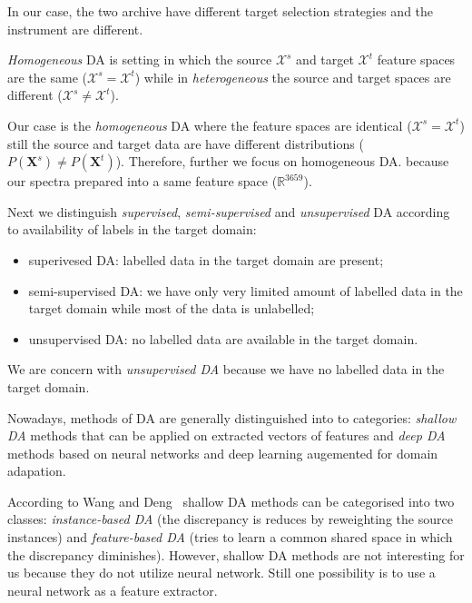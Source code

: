 In our case, the two archive have different target selection strategies
and the instrument are different.

\begin{definition}
	\textit{Homogeneous} DA is setting in which the source \(\mathcal{X}^s\)
	and target \(\mathcal{X}^t\) feature spaces are the same
	(\(\mathcal{X}^s = \mathcal{X}^t\))
	while in \textit{heterogeneous} the source and target spaces are different
	(\(\mathcal{X}^s \ne \mathcal{X}^t\)).~\cite{csurka2017}
\end{definition}

Our case is the \textit{homogeneous} DA where the feature spaces are identical
(\(\mathcal{X}^s = \mathcal{X}^t\))
still the source and target data are have different distributions
(\(P(\mathbf{X}^s) \ne P(\mathbf{X}^t)\)).
Therefore, further we focus on homogeneous DA.
because our spectra prepared into a same feature space (\(\mathbb{R}^{3659}\)).

Next we distinguish \textit{supervised}, \textit{semi-supervised}
and \textit{unsupervised} DA
according to availability of labels in the target domain:

\begin{itemize}
	\item superivesed DA: labelled data in the target domain are present;
	\item semi-supervised DA: we have only very limited amount of labelled data in the target domain while most of the data is unlabelled;
	\item unsupervised DA: no labelled data are available in the target domain.
\end{itemize}

We are concern with \textit{unsupervised DA} because we have
no labelled data in the target domain.~\cite{wang2018}

Nowadays, methods of DA are generally distinguished into to categories:
\textit{shallow DA} methods that can be applied on extracted vectors of features
and \textit{deep DA} methods based on neural networks and deep learning
augemented for domain adapation.~\cite{csurka2017}

According to Wang and Deng~\cite{wang2018} shallow DA methods
can be categorised into two classes:
\textit{instance-based DA}
(the discrepancy is reduces by reweighting the source instances)
and \textit{feature-based DA}
(tries to learn a common shared space in which the discrepancy diminishes).
However, shallow DA methods are not interesting for us
because they do not utilize neural network.
Still one possibility is to use a neural network as a feature extractor.~\cite{csurka2017}

